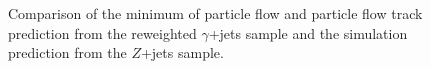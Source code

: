 \begin{figure}[!htbp]
\begin{center}
\caption{Comparison of the minimum of particle flow \met and particle flow track \met prediction from
the reweighted $\gamma$+jets sample and the simulation prediction from the $Z$+jets sample.}
\label{fig:PhotonJetsClosureTest_TrackMET}
\end{center}
\end{figure}

